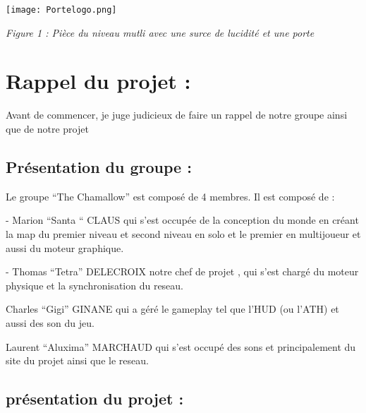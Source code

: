 \documentclass{article}
\begin{document}
\quad

\begin{centering}

\texttt{[image: Portelogo.png]}

\quad

\textit{Figure 1 : Pièce du niveau mutli avec une surce de lucidité et une porte}

\end{centering}


\quad


\newpage



\section{Rappel du projet :}

\quad

\quad

Avant de commencer, je juge judicieux de faire un rappel de notre groupe ainsi que de notre projet

	\subsection{Présentation du groupe :}

\quad

\quad

Le groupe “The Chamallow”  est composé de 4 membres. Il est composé de  : 

\quad
- Marion “Santa “ CLAUS  qui s’est occupée de la conception du monde en créant la map du premier niveau et second niveau en solo et le premier en multijoueur et aussi du moteur graphique.

\quad
- Thomas “Tetra” DELECROIX notre chef de projet , qui s’est chargé du moteur physique et la synchronisation du reseau.

\quad
Charles “Gigi” GINANE qui a géré le gameplay tel que l’HUD (ou l’ATH)  et aussi des son du jeu.

\quad
Laurent “Aluxima” MARCHAUD qui s’est occupé des sons et principalement du site du projet ainsi que le reseau.

\quad

\quad


	\subsection{présentation du projet :}

\quad
\end{document}
